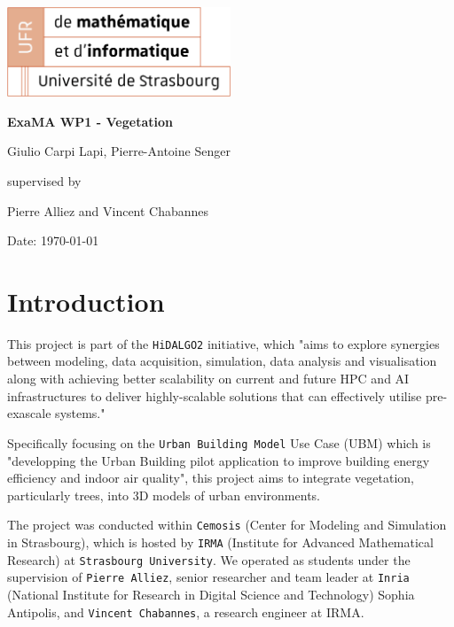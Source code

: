 \documentclass[12pt]{article}
\begin{document}
\begin{titlepage}
\centering
\includegraphics[width=0.5\textwidth]{images/logo_ufr.png}\par\vspace{1cm}
\vspace{1.5cm}
{\huge\bfseries ExaMA WP1 - Vegetation\par}
\vspace{2cm}
{\Large Giulio Carpi Lapi, Pierre-Antoine Senger\par}
\vfill
supervised by\par
Pierre Alliez and Vincent Chabannes

\vfill

{\large Date: \today\par}
\end{titlepage}

\tableofcontents

\newpage

\section{Introduction}

This project is part of the \texttt{HiDALGO2}\cite{hidalgo2} initiative, which
"aims to explore synergies between modeling, data acquisition, simulation,
data analysis and visualisation along with achieving better scalability on
current and future HPC and AI infrastructures to deliver highly-scalable
solutions that can effectively utilise pre-exascale systems."\cite{hidalgo2-about}

Specifically focusing on the \texttt{Urban Building Model}\cite{hidalgo2-ubm}
Use Case (UBM) which is "developping the Urban Building pilot application to
improve building energy efficiency and indoor air quality"\cite{hidalgo2-ubm},
this project aims to integrate vegetation, particularly trees, into 3D models
of urban environments.

The project was conducted within \texttt{Cemosis}\cite{cemosis} (Center for
Modeling and Simulation in Strasbourg), which is hosted by
\texttt{IRMA}\cite{irma} (Institute for Advanced Mathematical Research) at
\texttt{Strasbourg University}. We operated as students under the supervision of
\texttt{Pierre Alliez}\cite{alliez}, senior researcher and team leader at
\texttt{Inria}\cite{Inria} (National Institute for Research in Digital Science
and Technology) Sophia Antipolis, and \texttt{Vincent Chabannes}\cite{chabannes},
a research engineer at IRMA.
\end{document}
